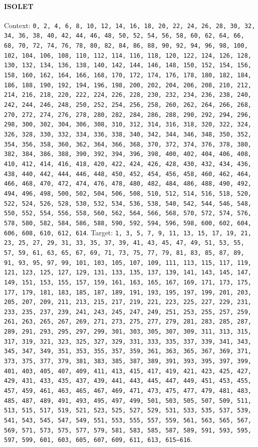 \paragraph{ISOLET} Context: \texttt{0, 2, 4, 6, 8, 10, 12, 14, 16, 18, 20, 22, 24, 26, 28, 30, 32, 34, 36, 38, 40, 42, 44, 46, 48, 50, 52, 54, 56, 58, 60, 62, 64, 66, 68, 70, 72, 74, 76, 78, 80, 82, 84, 86, 88, 90, 92, 94, 96, 98, 100, 102, 104, 106, 108, 110, 112, 114, 116, 118, 120, 122, 124, 126, 128, 130, 132, 134, 136, 138, 140, 142, 144, 146, 148, 150, 152, 154, 156, 158, 160, 162, 164, 166, 168, 170, 172, 174, 176, 178, 180, 182, 184, 186, 188, 190, 192, 194, 196, 198, 200, 202, 204, 206, 208, 210, 212, 214, 216, 218, 220, 222, 224, 226, 228, 230, 232, 234, 236, 238, 240, 242, 244, 246, 248, 250, 252, 254, 256, 258, 260, 262, 264, 266, 268, 270, 272, 274, 276, 278, 280, 282, 284, 286, 288, 290, 292, 294, 296, 298, 300, 302, 304, 306, 308, 310, 312, 314, 316, 318, 320, 322, 324, 326, 328, 330, 332, 334, 336, 338, 340, 342, 344, 346, 348, 350, 352, 354, 356, 358, 360, 362, 364, 366, 368, 370, 372, 374, 376, 378, 380, 382, 384, 386, 388, 390, 392, 394, 396, 398, 400, 402, 404, 406, 408, 410, 412, 414, 416, 418, 420, 422, 424, 426, 428, 430, 432, 434, 436, 438, 440, 442, 444, 446, 448, 450, 452, 454, 456, 458, 460, 462, 464, 466, 468, 470, 472, 474, 476, 478, 480, 482, 484, 486, 488, 490, 492, 494, 496, 498, 500, 502, 504, 506, 508, 510, 512, 514, 516, 518, 520, 522, 524, 526, 528, 530, 532, 534, 536, 538, 540, 542, 544, 546, 548, 550, 552, 554, 556, 558, 560, 562, 564, 566, 568, 570, 572, 574, 576, 578, 580, 582, 584, 586, 588, 590, 592, 594, 596, 598, 600, 602, 604, 606, 608, 610, 612, 614}. Target: \texttt{1, 3, 5, 7, 9, 11, 13, 15, 17, 19, 21, 23, 25, 27, 29, 31, 33, 35, 37, 39, 41, 43, 45, 47, 49, 51, 53, 55, 57, 59, 61, 63, 65, 67, 69, 71, 73, 75, 77, 79, 81, 83, 85, 87, 89, 91, 93, 95, 97, 99, 101, 103, 105, 107, 109, 111, 113, 115, 117, 119, 121, 123, 125, 127, 129, 131, 133, 135, 137, 139, 141, 143, 145, 147, 149, 151, 153, 155, 157, 159, 161, 163, 165, 167, 169, 171, 173, 175, 177, 179, 181, 183, 185, 187, 189, 191, 193, 195, 197, 199, 201, 203, 205, 207, 209, 211, 213, 215, 217, 219, 221, 223, 225, 227, 229, 231, 233, 235, 237, 239, 241, 243, 245, 247, 249, 251, 253, 255, 257, 259, 261, 263, 265, 267, 269, 271, 273, 275, 277, 279, 281, 283, 285, 287, 289, 291, 293, 295, 297, 299, 301, 303, 305, 307, 309, 311, 313, 315, 317, 319, 321, 323, 325, 327, 329, 331, 333, 335, 337, 339, 341, 343, 345, 347, 349, 351, 353, 355, 357, 359, 361, 363, 365, 367, 369, 371, 373, 375, 377, 379, 381, 383, 385, 387, 389, 391, 393, 395, 397, 399, 401, 403, 405, 407, 409, 411, 413, 415, 417, 419, 421, 423, 425, 427, 429, 431, 433, 435, 437, 439, 441, 443, 445, 447, 449, 451, 453, 455, 457, 459, 461, 463, 465, 467, 469, 471, 473, 475, 477, 479, 481, 483, 485, 487, 489, 491, 493, 495, 497, 499, 501, 503, 505, 507, 509, 511, 513, 515, 517, 519, 521, 523, 525, 527, 529, 531, 533, 535, 537, 539, 541, 543, 545, 547, 549, 551, 553, 555, 557, 559, 561, 563, 565, 567, 569, 571, 573, 575, 577, 579, 581, 583, 585, 587, 589, 591, 593, 595, 597, 599, 601, 603, 605, 607, 609, 611, 613, 615--616}.

